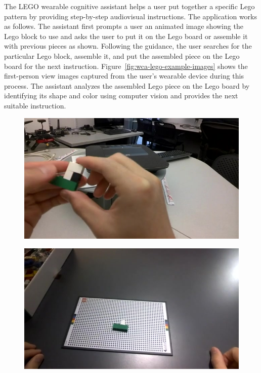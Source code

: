 The LEGO wearable cognitive assistant helps a user put together a specific Lego
pattern by providing step-by-step audiovisual instructions. The application
works as follows. The assistant first prompts a user an animated image showing
the Lego block to use and asks the user to put it on the Lego board or assemble
it with previous pieces as shown. Following the guidance, the user searches for
the particular Lego block, assemble it, and put the assembled piece on the Lego
board for the next instruction. Figure~\ref{fig:wca-lego-example-images} shows
the first-person view images captured from the user's wearable device during
this process. The assistant analyzes the assembled Lego piece on the Lego board
by identifying its shape and color using computer vision and provides the next
suitable instruction.

\begin{figure}
\centering
\begin{minipage}[]{0.31\linewidth}
\centering
\includegraphics[width=\linewidth]{FIGS/lego-dataset-1}\\
\end{minipage}
\begin{minipage}[]{0.31\linewidth}
\centering
\includegraphics[width=\linewidth]{FIGS/lego-dataset-2}\\

\end{minipage}
\end{figure}
